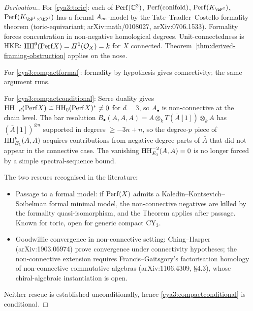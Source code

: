 \begin{proof}[Derivation.]
For \ref{cya3:toric}: each of $\mathrm{Perf}(\mathbb{C}^3)$, $\mathrm{Perf}(\mathrm{conifold})$,
$\Perf(K_{\bP^2})$, $\Perf(K_{\bP^1 \times \bP^1})$ has a formal
$A_\infty$-model by the Tate--Tradler--Costello formality theorem
(toric-equivariant; arXiv:math/0108027,
arXiv:0706.1533). Formality forces concentration in
non-negative homological degrees. Unit-connectedness is
HKR: $\mathrm{HH}^0(\mathrm{Perf} X) = H^0(\mathcal{O}_X) = k$ for $X$ connected.
Theorem~\ref{thm:derived-framing-obstruction} applies on the nose.

For \ref{cya3:compactformal}: formality by hypothesis gives
connectivity; the same argument runs.

For \ref{cya3:compactconditional}: Serre duality gives
$\mathrm{HH}_{-d}(\mathrm{Perf} X) \cong \mathrm{HH}_0(\mathrm{Perf} X)^* \neq 0$ for $d = 3$, so
$A_{\bullet}$ is non-connective at the chain level. The bar
resolution $B_\bullet(A, A, A) = A \otimes_k T(\bar A[1]) \otimes_k A$
has $(\bar A[1])^{\otimes n}$ supported in degrees $\geq -3n + n$,
so the degree-$p$ piece of $\mathrm{HH}^p_{E_1}(A,A)$ acquires
contributions from negative-degree parts of $\bar A$ that did not
appear in the connective case. The vanishing
$\mathrm{HH}^{-2}_{E_1}(A,A) = 0$ is no longer forced by a simple
spectral-sequence bound.

The two rescues recognised in the literature:
\begin{itemize}
\item Passage to a formal model: if $\mathrm{Perf}(X)$ admits a
Kaledin--Kontsevich--Soibelman formal minimal model, the
non-connective negatives are killed by the formality
quasi-isomorphism, and the Theorem applies after passage.
Known for toric, open for generic compact CY$_3$.

\item Goodwillie convergence in non-connective setting:
Ching--Harper (arXiv:1903.06974) prove convergence under
connectivity hypotheses; the non-connective extension requires
Francis--Gaitsgory's factorisation homology of non-connective
commutative algebras (arXiv:1106.4309, \S 4.3), whose
chiral-algebraic instantiation is open.
\end{itemize}
Neither rescue is established unconditionally, hence
\ref{cya3:compactconditional} is conditional.
\end{proof}

